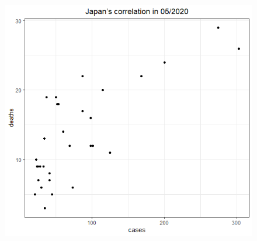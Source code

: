 \documentclass[a4paper]{article}
\theoremstyle{definition}
\begin{document}
\begin{enumerate}[1)]
\begin{figure}[H]
\begin{center}
        \includegraphics[scale = 0.3]{ix/ix.2/JPN_05_2020.png}
        

\end{center}
\end{figure}
\end{enumerate}
\end{document}
